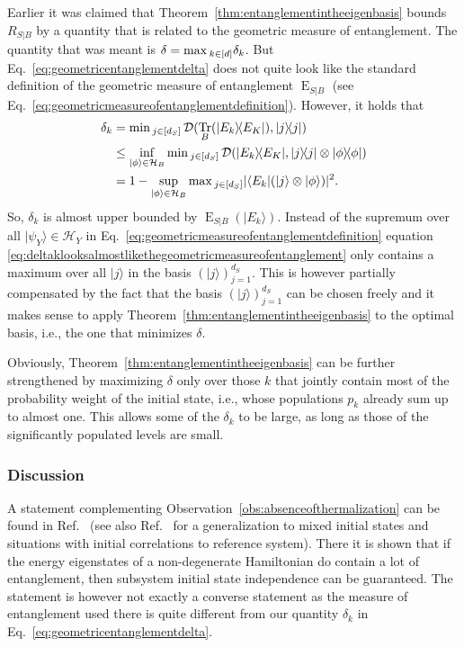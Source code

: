 \documentclass[a4paper,12pt,listof=totoc,index=totoc,bibliography=totoc,headsepline=false,headings=normal,BCOR16.153846mm,DIV12,headinclude,twoside,cleardoublepage=empty,numbers=noenddot,final]{scrreprt}
\theoremstyle{mystyle}
\numberwithin{equation}{section}
\numberwithin{figure}{section}
\numberwithin{lemma}{section}
\numberwithin{theorem}{section}
\numberwithin{corollary}{section}
\numberwithin{definition}{section}
\numberwithin{conjecture}{section}
\numberwithin{observation}{section}
\newcommand{\+}{\mkern2mu}
\newcommand{\texteqref}[1]{Eq.~\eqref{#1}}
\renewcommand{\max}{\mathchoice{\operatorname*{max}}{\operatorname*{max}}{\mathrm{max}}{\mathrm{max}}} %
\renewcommand{\min}{\mathchoice{\operatorname*{min}}{\operatorname*{min}}{\mathrm{min}}{\mathrm{min}}}
\newcommand{\bra}[1]{\langle #1|}
\newcommand{\ket}[1]{|#1\rangle}
\newcommand{\ketbra}[2]{\ket{#1}\!\bra{#2}}
\newcommand{\tracedistance}[3][]{
  \ifthenelse{\equal{#2}{}}
  {\ifthenelse{\equal{#3}{}}
    {\mathcal{D}_{#1}}{}
  }{
    \ifthenelse{\equal{#1}{}}
    {\operatorname{\mathcal{D}}(#2,#3)}
    {\operatorname{\mathcal{D}}_{#1}(#2,#3)}
  }
}
\DeclareMathOperator{\geometricentanglement}{E}
\DeclareMathOperator{\1}{\mathds{1}}
\DeclareMathOperator{\Tr}{Tr}
\newcommand{\mc}[1]{\mathcal{#1}}
\newcommand{\mcH}{\mc{H}}
\begin{document}
Earlier it was claimed that Theorem~\ref{thm:entanglementintheeigenbasis} bounds $R_{S|B}$ by a quantity that is related to the geometric measure of entanglement.
The quantity that was meant is $\delta = \max_{k\in[d]} \delta_k$. 
But \texteqref{eq:geometricentanglementdelta} does not quite look like the standard definition of the geometric measure of entanglement $\geometricentanglement_{S|B}$ (see \texteqref{eq:geometricmeasureofentanglementdefinition}).
However, it holds that \cite[Chapter 9.2]{nielsenchuang}
\begin{align}
  \delta_k &= \min_{j\in [d_S]} \tracedistance{\Tr_B(\ketbra{E_k}{E_K})}{\ketbra j j} \\
  &\leq \inf_{\ket\phi \in \mcH_B} \min_{j\in [d_S]} \tracedistance{\ketbra{E_k}{E_K}}{\ketbra j j \otimes \ketbra\phi\phi} \\
  &= 1 - \sup_{\ket\phi \in \mcH_B} \max_{j\in [d_S]} | \bra{E_k} (\ket j \otimes \ket\phi) |^2 . \label{eq:deltaklooksalmostlikethegeometricmeasureofentanglement}
\end{align}
So, $\delta_k$ is almost upper bounded by $\geometricentanglement_{S|B}(\ket{E_k})$.
Instead of the supremum over all $\ket{\psi_Y} \in \mcH_Y$ in \texteqref{eq:geometricmeasureofentanglementdefinition} equation \eqref{eq:deltaklooksalmostlikethegeometricmeasureofentanglement} only contains a maximum over all $\ket j$ in the basis $(\ket j)_{j=1}^{d_S}$.
This is however partially compensated by the fact that the basis $(\ket j)_{j=1}^{d_S}$ can be chosen freely and it makes sense to apply Theorem~\ref{thm:entanglementintheeigenbasis} to the optimal basis, i.e., the one that minimizes $\delta$.

Obviously, Theorem~\ref{thm:entanglementintheeigenbasis} can be further strengthened by maximizing $\delta$ only over those $k$ that jointly contain most of the probability weight of the initial state, i.e., whose populations $p_k$ already sum up to almost one.
This allows some of the $\delta_k$ to be large, as long as those of the significantly populated levels are small.

\subsubsection*{Discussion}
%
A statement complementing Observation~\ref{obs:absenceofthermalization} can be found in Ref.~\cite[Section B]{Linden09} (see also Ref.~\cite{MasterThesisHutter} for a generalization to mixed initial states and situations with initial correlations to reference system).
There it is shown that if the energy eigenstates of a non-degenerate Hamiltonian do contain a lot of entanglement, then subsystem initial state independence can be guaranteed.
The statement is however not exactly a converse statement as the measure of entanglement used there is quite different from our quantity $\delta_k$ in \texteqref{eq:geometricentanglementdelta}.
\end{document}
